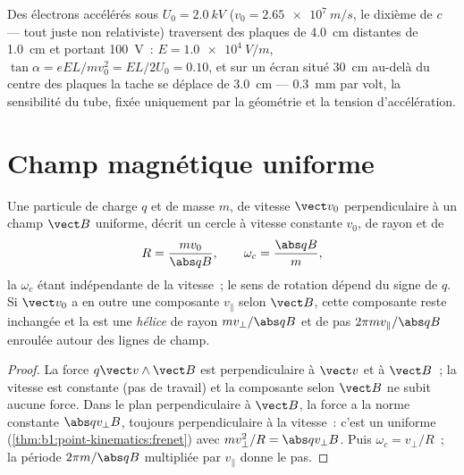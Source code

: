 \begin{example}\label{ex:b1:charged-particles:crt}
Des électrons accélérés sous $U_0 = \qty{2.0}{kV}$ ($v_0 = \qty{2.65e7}{m/s}$,
le dixième de $c$ --- tout juste non relativiste) traversent des plaques
de \qty{4.0}{cm} distantes de \qty{1.0}{cm} et portant \qty{100}{V}~:
$E = \qty{1.0e4}{V/m}$, $\tan\alpha = eEL/mv_0^2 = EL/2U_0 = 0.10$, et sur
un écran situé \qty{30}{cm} au-delà du centre des plaques la tache se
déplace de \qty{3.0}{cm} --- \qty{0.3}{mm} par volt, la sensibilité du
tube, fixée uniquement par la géométrie et la tension d'accélération.
\end{example}

\section{Champ magnétique uniforme}

\begin{theorem}\label{thm:b1:charged-particles:bfield}
Une particule de charge $q$ et de masse $m$, de vitesse $\vect v_0$
perpendiculaire à un champ $\vect B$ uniforme, décrit un cercle à vitesse
constante $v_0$, de rayon et de 
\[
R = \frac{mv_0}{\abs q B}, \qquad \omega_c = \frac{\abs q B}{m},
\]
la \emph{} $\omega_c$ étant indépendante de la
vitesse~; le sens de rotation dépend du signe de $q$. Si $\vect v_0$ a
en outre une composante $v_\parallel$ selon $\vect B$, cette composante
reste inchangée et la  est une \emph{hélice} de rayon
$mv_\perp/\abs qB$ et de pas $2\pi mv_\parallel/\abs qB$ enroulée autour
des lignes de champ.
\end{theorem}

\begin{proof}
La force $q\vect v\wedge\vect B$ est perpendiculaire à $\vect v$ et à $\vect B$~;
la vitesse est constante (pas de travail) et la composante selon
$\vect B$ ne subit aucune force. Dans le plan perpendiculaire à
$\vect B$, la force a la norme constante $\abs qv_\perp B$, toujours
perpendiculaire à la vitesse~: c'est un  uniforme
(\cref{thm:b1:point-kinematics:frenet}) avec $mv_\perp^2/R =
\abs qv_\perp B$. Puis $\omega_c = v_\perp/R$~; la période $2\pi m/\abs qB$
multipliée par $v_\parallel$ donne le pas.
\end{proof}

